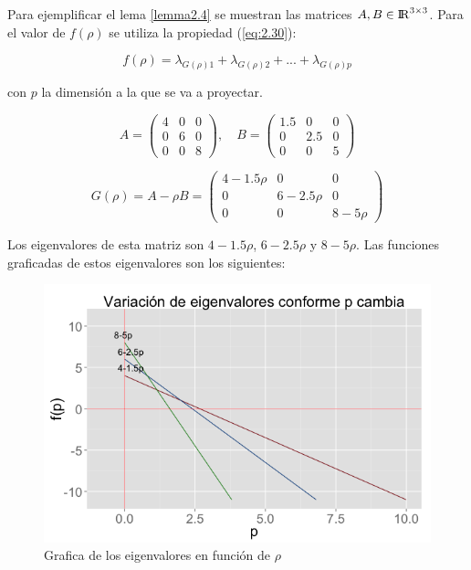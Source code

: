 \begin{example} \label{ex:1}
Para ejemplificar el lema \ref{lemma2.4} se muestran las matrices $A,B \in {\rm I\!R}^{3 \times 3}$. Para el valor de $f(\rho)$ se utiliza la propiedad (\ref{eq:2.30}):

$$f(\rho) = \lambda_{G(\rho)1} + \lambda_{G(\rho)2} + ... + \lambda_{G(\rho)p}$$

con $p$ la dimensión a la que se va a proyectar. 


\begin{equation*}
A = \left(\!
    \begin{array}{ccc}
      4 & 0 & 0 \\
      0 & 6 & 0 \\
      0 & 0 & 8 
    \end{array}
  \!\right), \quad
B = \left(\!
    \begin{array}{ccc}
      1.5 & 0 & 0 \\
      0 & 2.5 & 0 \\
      0 & 0 & 5 
    \end{array}
\!\right) 
\end{equation*}



\begin{equation*}
G(\rho) = A- \rho B = \left(\!
    \begin{array}{ccc}
      4-1.5\rho & 0 & 0 \\
      0 & 6-2.5\rho & 0 \\
      0 & 0 & 8-5\rho 
    \end{array}   	
      \!\right) 
\end{equation*}

Los eigenvalores de esta matriz son $4-1.5\rho$,  $6-2.5\rho$ y  $8-5\rho$. Las funciones graficadas de estos eigenvalores son los siguientes:

\begin{figure}[!ht]
  \centering
  \includegraphics[width=1\textwidth]{Figures/Chapter2_3eigen}  
  \caption{Grafica de los eigenvalores en función de $\rho$}
\end{figure}



\end{example}
